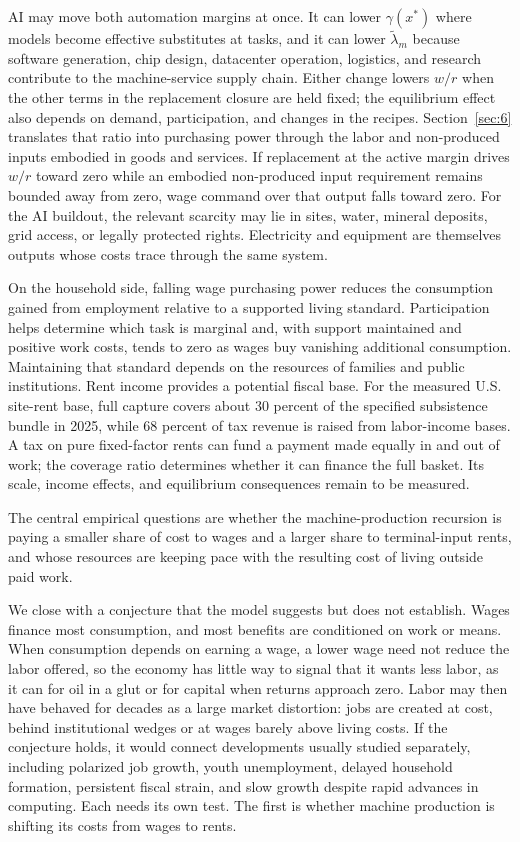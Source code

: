 \documentclass[12pt]{article}
\theoremstyle{plain}
\begin{document}
AI may move both automation margins at once. It can lower $\gamma(x^*)$ where models become effective substitutes at tasks, and it can lower $\widetilde{\lambda}_m$ because software generation, chip design, datacenter operation, logistics, and research contribute to the machine-service supply chain. Either change lowers $w/r$ when the other terms in the replacement closure are held fixed; the equilibrium effect also depends on demand, participation, and changes in the recipes. Section~\ref{sec:6} translates that ratio into purchasing power through the labor and non-produced inputs embodied in goods and services. If replacement at the active margin drives $w/r$ toward zero while an embodied non-produced input requirement remains bounded away from zero, wage command over that output falls toward zero. For the AI buildout, the relevant scarcity may lie in sites, water, mineral deposits, grid access, or legally protected rights. Electricity and equipment are themselves outputs whose costs trace through the same system.

On the household side, falling wage purchasing power reduces the consumption gained from employment relative to a supported living standard. Participation helps determine which task is marginal and, with support maintained and positive work costs, tends to zero as wages buy vanishing additional consumption. Maintaining that standard depends on the resources of families and public institutions. Rent income provides a potential fiscal base. For the measured U.S. site-rent base, full capture covers about 30 percent of the specified subsistence bundle in 2025, while 68 percent of tax revenue is raised from labor-income bases. A tax on pure fixed-factor rents can fund a payment made equally in and out of work; the coverage ratio determines whether it can finance the full basket. Its scale, income effects, and equilibrium consequences remain to be measured.

The central empirical questions are whether the machine-production recursion
is paying a smaller share of cost to wages and a larger share to
terminal-input rents, and whose resources are keeping pace with the resulting cost of living outside paid work.

We close with a conjecture that the model suggests but does not establish. Wages finance most consumption, and most benefits are conditioned on work or means. When consumption depends on earning a wage, a lower wage need not reduce the labor offered, so the economy has little way to signal that it wants less labor, as it can for oil in a glut or for capital when returns approach zero. Labor may then have behaved for decades as a large market distortion: jobs are created at cost, behind institutional wedges or at wages barely above living costs. If the conjecture holds, it would connect developments usually studied separately, including polarized job growth, youth unemployment, delayed household formation, persistent fiscal strain, and slow growth despite rapid advances in computing. Each needs its own test. The first is whether machine production is shifting its costs from wages to rents.
\end{document}
